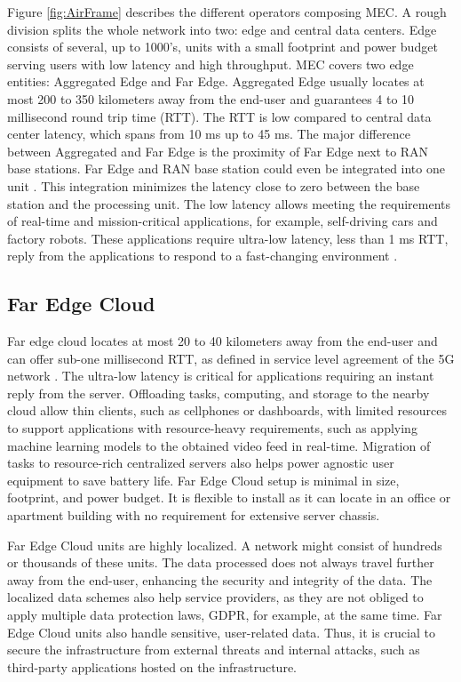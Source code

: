 Figure \ref{fig:AirFrame} describes the different operators composing MEC. A rough division splits the whole network into two: edge and central data centers. Edge consists of several, up to 1000's, units with a small footprint and power budget serving users with low latency and high throughput. MEC covers two edge entities: Aggregated Edge and Far Edge. Aggregated Edge usually locates at most 200 to 350 kilometers away from the end-user and guarantees 4 to 10 millisecond round trip time (RTT). The RTT is low compared to central data center latency, which spans from 10 ms up to 45 ms. The major difference between Aggregated and Far Edge is the proximity of Far Edge next to RAN base stations. Far Edge and RAN base station could even be integrated into one unit \cite{AirFrameOpenEdgeServer}. This integration minimizes the latency close to zero between the base station and the processing unit. The low latency allows meeting the requirements of real-time and mission-critical applications, for example, self-driving cars and factory robots. These applications require ultra-low latency, less than 1 ms RTT, reply from the applications to respond to a fast-changing environment \cite{Ning2019}.

\subsection{Far Edge Cloud}

Far edge cloud locates at most 20 to 40 kilometers away from the end-user and can offer sub-one millisecond RTT, as defined in service level agreement of the 5G network \cite{Parvez2018}. The ultra-low latency is critical for applications requiring an instant reply from the server. Offloading tasks, computing, and storage to the nearby cloud allow thin clients, such as cellphones or dashboards, with limited resources to support applications with resource-heavy requirements, such as applying machine learning models to the obtained video feed in real-time. Migration of tasks to resource-rich centralized servers also helps power agnostic user equipment to save battery life. Far Edge Cloud setup is minimal in size, footprint, and power budget. It is flexible to install as it can locate in an office or apartment building with no requirement for extensive server chassis. \cite{AirFrameOpenEdgeServer}

Far Edge Cloud units are highly localized. A network might consist of hundreds or thousands of these units. The data processed does not always travel further away from the end-user, enhancing the security and integrity of the data. The localized data schemes also help service providers, as they are not obliged to apply multiple data protection laws, GDPR, for example, at the same time. Far Edge Cloud units also handle sensitive, user-related data. Thus, it is crucial to secure the infrastructure from external threats and internal attacks, such as third-party applications hosted on the infrastructure.

